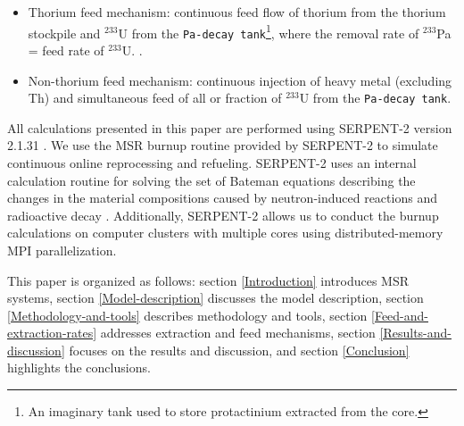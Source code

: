 \begin{itemize}
	\item Thorium feed mechanism: continuous feed flow of thorium from the thorium stockpile and $^{233}$U from the \texttt{Pa-decay tank}\footnote{An imaginary tank used to store protactinium extracted from the core.}, where the removal rate of $^{233}$Pa = feed rate of $^{233}$U. \cite{betzler2016modeling}.
	\item Non-thorium feed mechanism: continuous injection of heavy metal (excluding Th) and simultaneous feed of all or fraction of $^{233}$U from the \texttt{Pa-decay tank}.
\end{itemize}

All calculations presented in this paper are performed using SERPENT-2 version 2.1.31 \cite{leppanen2014serpent}. We use the MSR burnup routine provided by SERPENT-2 to simulate continuous online reprocessing and refueling. SERPENT-2 uses an internal calculation routine for solving the set of Bateman equations describing the changes in the material compositions caused by neutron-induced reactions and radioactive decay \cite{leppanen2014serpent}. Additionally, SERPENT-2 allows us to conduct the burnup calculations on computer clusters with multiple cores using distributed-memory MPI parallelization.

This paper is organized as follows: section \ref{Introduction} introduces \gls{MSR} systems, section \ref{Model-description} discusses the model description, section \ref{Methodology-and-tools} describes methodology and tools, section \ref{Feed-and-extraction-rates} addresses extraction and feed mechanisms, section \ref{Results-and-discussion} focuses on the results and discussion, and section \ref{Conclusion} highlights the conclusions.




